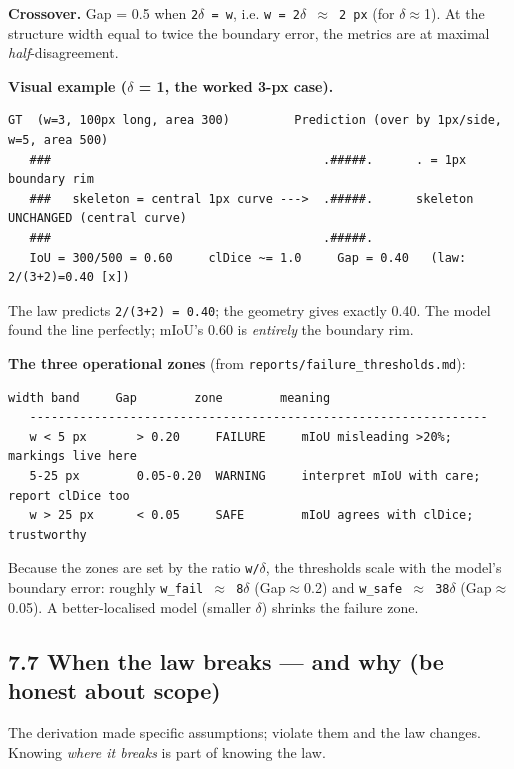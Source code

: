 \documentclass[11pt]{article}
\begin{document}
\textbf{Crossover.} Gap = 0.5 when \texttt{2$\delta$ = w}, i.e. \texttt{w = 2$\delta$ $\approx$ 2 px} (for $\delta$$\approx$1). At the structure width equal to twice the boundary error, the metrics are at maximal \textit{half}-disagreement.

\textbf{Visual example ($\delta$ = 1, the worked 3-px case).}
\begin{Verbatim}[breaklines=true,breakanywhere=true,fontsize=\footnotesize]
   GT  (w=3, 100px long, area 300)         Prediction (over by 1px/side, w=5, area 500)
   ###                                      .#####.      . = 1px boundary rim
   ###   skeleton = central 1px curve --->  .#####.      skeleton UNCHANGED (central curve)
   ###                                      .#####.
   IoU = 300/500 = 0.60     clDice ~= 1.0     Gap = 0.40   (law: 2/(3+2)=0.40 [x])
\end{Verbatim}
The law predicts \texttt{2/(3+2) = 0.40}; the geometry gives exactly 0.40. The model found the line perfectly; mIoU's 0.60 is \textit{entirely} the boundary rim.

\textbf{The three operational zones} (from \texttt{reports/failure\_thresholds.md}):

\begin{Verbatim}[breaklines=true,breakanywhere=true,fontsize=\footnotesize]
   width band     Gap        zone        meaning
   ----------------------------------------------------------------
   w < 5 px       > 0.20     FAILURE     mIoU misleading >20%; markings live here
   5-25 px        0.05-0.20  WARNING     interpret mIoU with care; report clDice too
   w > 25 px      < 0.05     SAFE        mIoU agrees with clDice; trustworthy
\end{Verbatim}

Because the zones are set by the ratio \texttt{w/$\delta$}, the thresholds scale with the model's boundary error: roughly \texttt{w\_fail $\approx$ 8$\delta$} (Gap$\approx$0.2) and \texttt{w\_safe $\approx$ 38$\delta$} (Gap$\approx$0.05). A better-localised model (smaller $\delta$) shrinks the failure zone.

\subsection*{7.7 When the law breaks --- and why (be honest about scope)}

The derivation made specific assumptions; violate them and the law changes. Knowing \textit{where it breaks} is part of knowing the law.
\end{document}
